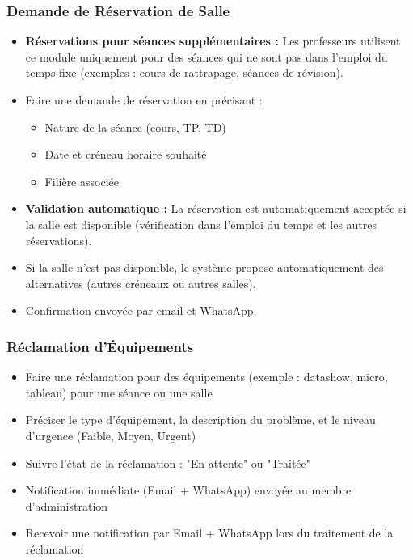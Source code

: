 \documentclass[12pt,a4paper]{article}
\begin{document}
\subsubsection{Demande de Réservation de Salle}
\begin{itemize}
    \item \textbf{Réservations pour séances supplémentaires :} Les professeurs utilisent ce module uniquement pour des séances qui ne sont pas dans l'emploi du temps fixe (exemples : cours de rattrapage, séances de révision).
    \item Faire une demande de réservation en précisant :
    \begin{itemize}
        \item Nature de la séance (cours, TP, TD)
        \item Date et créneau horaire souhaité
        \item Filière associée
    \end{itemize}
    \item \textbf{Validation automatique :} La réservation est automatiquement acceptée si la salle est disponible (vérification dans l'emploi du temps et les autres réservations).
    \item Si la salle n'est pas disponible, le système propose automatiquement des alternatives (autres créneaux ou autres salles).
    \item Confirmation envoyée par email et WhatsApp.
\end{itemize}

\subsubsection{Réclamation d'Équipements}
\begin{itemize}
    \item Faire une réclamation pour des équipements (exemple : datashow, micro, tableau) pour une séance ou une salle
    \item Préciser le type d'équipement, la description du problème, et le niveau d'urgence (Faible, Moyen, Urgent)
    \item Suivre l'état de la réclamation : "En attente" ou "Traitée"
    \item Notification immédiate (Email + WhatsApp) envoyée au membre d'administration
    \item Recevoir une notification par Email + WhatsApp lors du traitement de la réclamation
\end{itemize}
\end{document}
